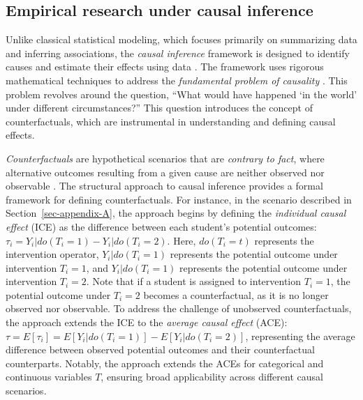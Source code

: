 \documentclass[
  authoryear,
  review,
  1p]{elsarticle}
\begin{document}
\subsection{Empirical research under causal
inference}\label{sec-appendix-B}

Unlike classical statistical modeling, which focuses primarily on
summarizing data and inferring associations, the \emph{causal inference}
framework is designed to identify causes and estimate their effects
using data \citep{Shaughnessy_et_al_2010, Neal_2020}. The framework uses
rigorous mathematical techniques to address the \emph{fundamental
problem of causality}
\citep{Pearl_2009, Pearl_et_al_2016, Morgan_et_al_2014}. This problem
revolves around the question, ``What would have happened `in the world'
under different circumstances?'' This question introduces the concept of
counterfactuals, which are instrumental in understanding and defining
causal effects.

\emph{Counterfactuals} are hypothetical scenarios that are
\emph{contrary to fact}, where alternative outcomes resulting from a
given cause are neither observed nor observable
\citep{Neal_2020, Counterfactual_2024}. The structural approach to
causal inference \citep{Pearl_2009, Pearl_et_al_2016} provides a formal
framework for defining counterfactuals. For instance, in the scenario
described in Section~\ref{sec-appendix-A}, the approach begins by
defining the \emph{individual causal effect} (ICE) as the difference
between each student's potential outcomes:
\(\tau_{i} = Y_{i}|do(T_{i}=1) - Y_{i}|do(T_{i}=2)\). Here,
\(do(T_{i}=t)\) represents the intervention operator,
\(Y_{i}|do(T_{i}=1)\) represents the potential outcome under
intervention \(T_{i}=1\), and \(Y_{i}|do(T_{i}=1)\) represents the
potential outcome under intervention \(T_{i}=2\). Note that if a student
is assigned to intervention \(T_{i}=1\), the potential outcome under
\(T_{i}=2\) becomes a counterfactual, as it is no longer observed nor
observable. To address the challenge of unobserved counterfactuals, the
approach extends the ICE to the \emph{average causal effect} (ACE):
\(\tau = E[\tau_{i}] = E[Y_{i}|do(T_{i}=1)]- E[Y_{i}|do(T_{i}=2)]\),
representing the average difference between observed potential outcomes
and their counterfactual counterparts. Notably, the approach extends the
ACEs for categorical and continuous variables \(T\), ensuring broad
applicability across different causal scenarios.
\end{document}
